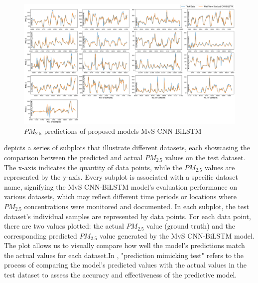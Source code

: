 \documentclass[a4paper, fleqn]{cas-sc}
\theoremstyle{definition}
\theoremstyle{remark}
\begin{document}
\begin{figure}[h!]
	\centering
		\includegraphics[scale=0.29]{act vs pri}
	  \caption{$PM_{2.5}$ predictions of proposed models MvS CNN-BiLSTM}\label{ACt_vs_Pred}
\end{figure}
 depicts a series of subplots that illustrate different datasets,  each showcasing the comparison between the predicted and actual $PM_{2.5}$ values on the test dataset. The x-axis indicates the quantity of data points,  while the $PM_{2.5}$ values are represented by the y-axis. Every subplot is associated with a specific dataset name,  signifying the MvS CNN-BiLSTM model's evaluation performance on various datasets,  which may reflect different time periods or locations where $PM_{2.5}$ concentrations were monitored and documented. In each subplot,  the test dataset's individual samples are represented by data points. For each data point,  there are two values plotted:  the actual $PM_{2.5}$ value (ground truth) and the corresponding predicted $PM_{2.5}$ value generated by the MvS CNN-BiLSTM model. The plot allows us to visually compare how well the model's predictions match the actual values for each dataset.In ,  "prediction mimicking test" refers to the process of comparing the model's predicted values with the actual values in the test dataset to assess the accuracy and effectiveness of the predictive model.
\end{document}

